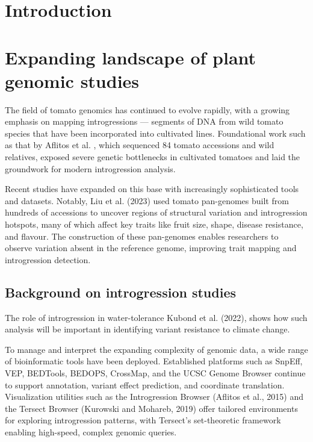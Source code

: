 \documentclass[unnumsec,webpdf,contemporary,large]{oup-authoring-template}%
\theoremstyle{thmstyleone}%
\theoremstyle{thmstyletwo}%
\theoremstyle{thmstylethree}%
\begin{document}

\maketitle
\section{Introduction}

\section{Expanding landscape of plant genomic studies}\label{sec2}

The field of tomato genomics has continued to evolve rapidly, with a growing emphasis on mapping introgressions — segments of DNA from wild tomato species that have been incorporated into cultivated lines. Foundational work such as that by Aflitos et al. \cite{RN7} , which sequenced 84 tomato accessions and wild relatives, exposed severe genetic bottlenecks in cultivated tomatoes and laid the groundwork for modern introgression analysis. 

Recent studies have expanded on this base with increasingly sophisticated tools and datasets. Notably, Liu et al. (2023) used tomato pan-genomes built from hundreds of accessions to uncover regions of structural variation and introgression hotspots, many of which affect key traits like fruit size, shape, disease resistance, and flavour. The construction of these pan-genomes enables researchers to observe variation absent in the reference genome, improving trait mapping and introgression detection. 

\subsection{Background on introgression studies}\label{subsec1}

The role of introgression in water-tolerance Kubond et al. (2022), shows how such analysis will be important in identifying variant resistance to climate change.  

To manage and interpret the expanding complexity of genomic data, a wide range of bioinformatic tools have been deployed. Established platforms such as SnpEff, VEP, BEDTools, BEDOPS, CrossMap, and the UCSC Genome Browser continue to support annotation, variant effect prediction, and coordinate translation. Visualization utilities such as the Introgression Browser (Aflitos et al., 2015) and the Tersect Browser (Kurowski and Mohareb, 2019) offer tailored environments for exploring introgression patterns, with Tersect’s set-theoretic framework enabling high-speed, complex genomic queries. 
\end{document}
